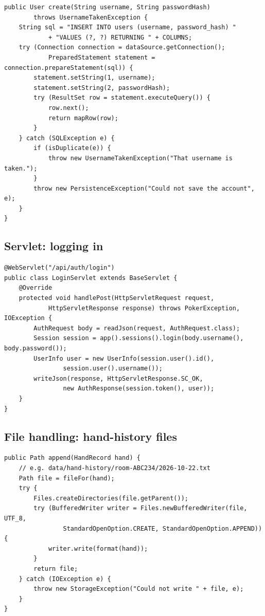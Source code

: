 \documentclass[12pt,a4paper]{article}
\newcommand{\cls}[1]{\texttt{#1}}
\begin{document}
\begin{lstlisting}[caption={Part of \cls{UserDao} (poker-server, \cls{server.db}).}]
public User create(String username, String passwordHash)
        throws UsernameTakenException {
    String sql = "INSERT INTO users (username, password_hash) "
            + "VALUES (?, ?) RETURNING " + COLUMNS;
    try (Connection connection = dataSource.getConnection();
            PreparedStatement statement = connection.prepareStatement(sql)) {
        statement.setString(1, username);
        statement.setString(2, passwordHash);
        try (ResultSet row = statement.executeQuery()) {
            row.next();
            return mapRow(row);
        }
    } catch (SQLException e) {
        if (isDuplicate(e)) {
            throw new UsernameTakenException("That username is taken.");
        }
        throw new PersistenceException("Could not save the account", e);
    }
}
\end{lstlisting}

\subsection{Servlet: logging in}
\begin{lstlisting}[caption={\cls{LoginServlet} (poker-server, \cls{server.web}).}]
@WebServlet("/api/auth/login")
public class LoginServlet extends BaseServlet {
    @Override
    protected void handlePost(HttpServletRequest request,
            HttpServletResponse response) throws PokerException, IOException {
        AuthRequest body = readJson(request, AuthRequest.class);
        Session session = app().sessions().login(body.username(), body.password());
        UserInfo user = new UserInfo(session.user().id(),
                session.user().username());
        writeJson(response, HttpServletResponse.SC_OK,
                new AuthResponse(session.token(), user));
    }
}
\end{lstlisting}

\subsection{File handling: hand-history files}
\begin{lstlisting}[caption={Part of \cls{HandHistoryFileWriter} (poker-server, \cls{server.io}).}]
public Path append(HandRecord hand) {
    // e.g. data/hand-history/room-ABC234/2026-10-22.txt
    Path file = fileFor(hand);
    try {
        Files.createDirectories(file.getParent());
        try (BufferedWriter writer = Files.newBufferedWriter(file, UTF_8,
                StandardOpenOption.CREATE, StandardOpenOption.APPEND)) {
            writer.write(format(hand));
        }
        return file;
    } catch (IOException e) {
        throw new StorageException("Could not write " + file, e);
    }
}
\end{lstlisting}
\end{document}
